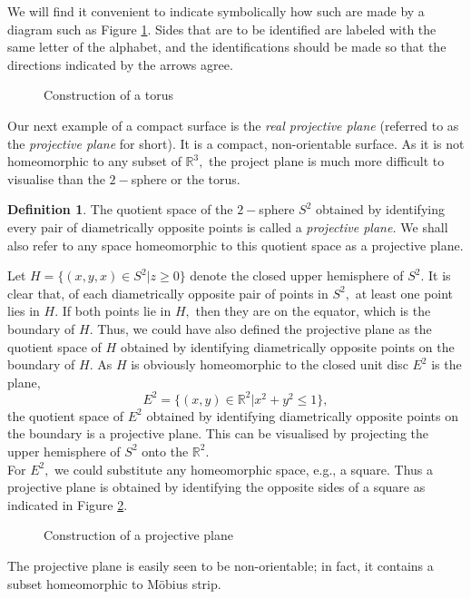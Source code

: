 \documentclass{article}
\theoremstyle{definition}
\newtheorem{defn}[theorem]{Definition}
\begin{document}
We will find it convenient to indicate symbolically how such are made by a diagram such as Figure \ref{fig:torus}. Sides that are to be identified are labeled with the same letter of the alphabet, and the identifications should be made so that the directions indicated by the arrows agree. \\
\begin{figure}[htb]
  \centering
  
  \caption{Construction of a torus}
  \label{fig:torus}
\end{figure}
Our next example of a compact surface is the \emph{real projective plane} (referred to as the \emph{projective plane} for short). It is a compact, non-orientable surface. As it is not homeomorphic to any subset of $\mathbb{R}^3,$ the project plane is much more difficult to visualise than the $2-$sphere or the torus.
\begin{defn}
  The quotient space of the $2-$sphere $S^2$ obtained by identifying every pair of diametrically opposite points is called a \emph{projective plane.} We shall also refer to any space homeomorphic to this quotient space as a projective plane.
\end{defn}
Let $H = \{(x, y, x) \in S^2 | z \ge 0\}$ denote the closed upper hemisphere of $S^2.$
It is clear that, of each diametrically opposite pair of points in $S^2,$ at least one point lies in $H.$ If both points lie in $H,$ then they are on the equator, which is the boundary of $H.$ Thus, we could have also defined the projective plane as the quotient space of $H$ obtained by identifying diametrically opposite points on the boundary of $H.$ As $H$ is obviously homeomorphic to the closed unit disc $E^2$ is the plane,
\[E^2 = \{(x, y) \in \mathbb{R}^2|x^2 + y^2 \le 1\},\]
the quotient space of $E^2$ obtained by identifying diametrically opposite points on the boundary is a projective plane. This can be visualised by projecting the upper hemisphere of $S^2$ onto the $\mathbb{R}^2.$\\
For $E^2,$ we could substitute any homeomorphic space, e.g., a square. Thus a projective plane is obtained by identifying the opposite sides of a square as indicated in Figure \ref{fig:projective plane}.
\begin{figure}[htb]
  \centering
  
  \caption{Construction of a projective plane}
  \label{fig:projective plane}
\end{figure}
The projective plane is easily seen to be non-orientable; in fact, it contains a subset homeomorphic to M\"{o}bius strip. \\
\end{document}
